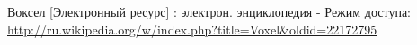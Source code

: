 \renewcommand{\refname}{Список литературы}
\begin{thebibliography}{99}

		Воксел [Электронный ресурс] : электрон. энциклопедия - Режим доступа: \url{http://ru.wikipedia.org/w/index.php?title=Voxel&oldid=22172795}

\end{thebibliography}

